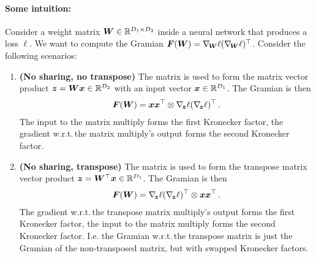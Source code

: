 \paragraph{Some intuition:} Consider a weight matrix ${\bm{W}} \in {\mathbb{R}}^{D_1 \times
  D_2}$ inside a neural network that produces a loss $\ell$. We want to compute
the Gramian ${\bm{F}}({\bm{W}}) = \nabla_{\!{{\bm{W}}}}\ell (\nabla_{\!{{\bm{W}}}}\ell)^{\top}$. Consider the following scenarios:
\begin{enumerate}
\item \textbf{(No sharing, no transpose)} The matrix is used to form the matrix vector product ${\bm{z}} = {\bm{W}} {\bm{x}} \in {\mathbb{R}}^{D_2}$ with an input vector ${\bm{x}} \in {\mathbb{R}}^{D_1}$.
  The Gramian is then
  \begin{align*}
    {\bm{F}}({\bm{W}}) = {\bm{x}} {\bm{x}}^{\top} \otimes \nabla_{\!{{\bm{z}}}}\ell (\nabla_{\!{{\bm{z}}}}\ell)^{\top}\,.
  \end{align*}
  The input to the matrix multiply forms the first Kronecker factor, the gradient w.r.t.\,the matrix multiply's output forms the second Kronecker factor.

\item \textbf{(No sharing, transpose)} The matrix is used to form the transpose matrix vector product ${\bm{z}} = {\bm{W}}^{\top} {\bm{x}} \in {\mathbb{R}}^{D_1}$.
  The Gramian is then
  \begin{align*}
    {\bm{F}}({\bm{W}}) = \nabla_{\!{{\bm{z}}}}\ell (\nabla_{\!{{\bm{z}}}}\ell)^{\top} \otimes {\bm{x}} {\bm{x}}^{\top}\,.
  \end{align*}
  The gradient w.r.t.\,the transpose matrix multiply's output forms the first Kronecker factor, the input to the matrix multiply forms the second Kronecker factor.
  I.e.
  the Gramian w.r.t.\,the transpose matrix is just the Gramian of the non-transposed matrix, but with swapped Kronecker factors.


\end{enumerate}
